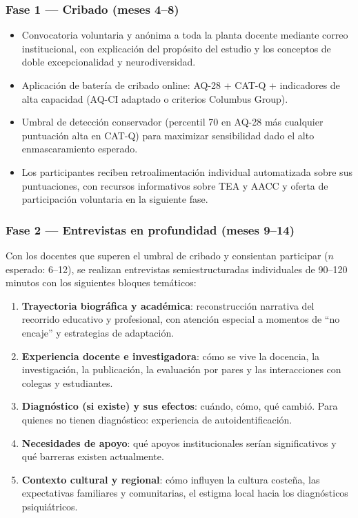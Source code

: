 \subsubsection{Fase 1 — Cribado (meses 4--8)}

\begin{itemize}[leftmargin=*, itemsep=2pt]
    \item Convocatoria voluntaria y anónima a toda la planta docente mediante
    correo institucional, con explicación del propósito del estudio y los conceptos
    de doble excepcionalidad y neurodiversidad.
    \item Aplicación de batería de cribado online: AQ-28 + CAT-Q + indicadores
    de alta capacidad (AQ-CI adaptado o criterios Columbus Group).
    \item Umbral de detección conservador (percentil 70 en AQ-28 más cualquier
    puntuación alta en CAT-Q) para maximizar sensibilidad dado el alto
    enmascaramiento esperado.
    \item Los participantes reciben retroalimentación individual automatizada sobre
    sus puntuaciones, con recursos informativos sobre TEA y AACC y oferta de
    participación voluntaria en la siguiente fase.
\end{itemize}

\subsubsection{Fase 2 — Entrevistas en profundidad (meses 9--14)}

Con los docentes que superen el umbral de cribado y consientan participar
($n$ esperado: 6--12), se realizan entrevistas semiestructuradas individuales
de 90--120 minutos con los siguientes bloques temáticos:

\begin{enumerate}[leftmargin=*, label=\textbf{B\arabic*.}, itemsep=3pt]
    \item \textbf{Trayectoria biográfica y académica}: reconstrucción narrativa
    del recorrido educativo y profesional, con atención especial a momentos de
    ``no encaje'' y estrategias de adaptación.
    \item \textbf{Experiencia docente e investigadora}: cómo se vive la docencia,
    la investigación, la publicación, la evaluación por pares y las interacciones
    con colegas y estudiantes.
    \item \textbf{Diagnóstico (si existe) y sus efectos}: cuándo, cómo, qué
    cambió. Para quienes no tienen diagnóstico: experiencia de autoidentificación.
    \item \textbf{Necesidades de apoyo}: qué apoyos institucionales serían
    significativos y qué barreras existen actualmente.
    \item \textbf{Contexto cultural y regional}: cómo influyen la cultura costeña,
    las expectativas familiares y comunitarias, el estigma local hacia los
    diagnósticos psiquiátricos.
\end{enumerate}

